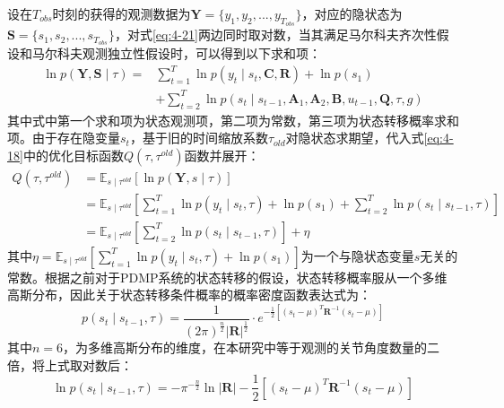 设在$T_{obs}$时刻的获得的观测数据为$\mathbf{Y}=\{y_1,y_2,...,y_{T_{obs}}\}$，对应的隐状态为$\mathbf S = \{s_1,s_2,...,s_{T_{obs}}\}$，对式\ref{eq:4-21}两边同时取对数，当其满足马尔科夫齐次性假设和马尔科夫观测独立性假设时，可以得到以下求和项：
\begin{equation}
    \begin{aligned}
    \ln p(\mathbf{Y}, \mathbf{S} \mid \tau)= & \sum_{t=1}^T \ln p\left(y_t \mid s_t, \mathbf{C}, \mathbf{R}\right)+\ln p\left(s_1\right) \\
    & +\sum_{t=2}^T \ln p\left(s_t \mid s_{t-1}, \mathbf{A}_1, \mathbf{A}_2, \mathbf{B}, u_{t-1}, \mathbf{Q}, \tau, g\right)
    \end{aligned}
    \label{eq:4-20}
\end{equation}
其中式中第一个求和项为状态观测项，第二项为常数，第三项为状态转移概率求和项。由于存在隐变量$s_t$，基于旧的时间缩放系数$\tau_{old}$对隐状态求期望，代入式\ref{eq:4-18}中的优化目标函数$ Q\left(\tau, \tau^{old}\right)$函数并展开：
\begin{equation}
\begin{aligned}
    Q\left(\tau, \tau^{old}\right)
    &=\mathbb{E}_{s \mid \tau^{old}}\left[\ln p(\mathbf{Y}, s \mid \tau)\right]\\
    & =\mathbb{E}_{s \mid \tau^{old}}\left[\sum_{t=1}^T \ln p\left(y_t \mid s_t, \tau\right)+\ln p\left(s_1\right)+\sum_{t=2}^T \ln p\left(s_t \mid s_{t-1}, \tau\right)\right] \\
    & =\mathbb{E}_{s \mid \tau^{old}}\left[\sum_{t=2}^T \ln p\left(s_t \mid s_{t-1}, \tau\right)\right] + \eta 
\end{aligned}
\label{eq:4-21}
\end{equation}
其中$\eta=\mathbb{E}_{s \mid \tau^{old}} \left[\sum_{t=1}^T \ln p\left(y_t \mid s_t, \tau\right) + \ln p\left(s_1\right)\right]$为一个与隐状态变量$s$无关的常数。根据之前对于PDMP系统的状态转移的假设，状态转移概率服从一个多维高斯分布，因此关于状态转移条件概率的概率密度函数表达式为：
\begin{equation}
    p\left(s_t \mid s_{t-1}, \tau\right)=\frac{1}{(2 \pi)^{\frac{n}{2}}|\mathbf{R}|^{\frac{1}{2}}} \cdot e^{-\frac{1}{2}\left[\left(s_t-\mu\right)^T \mathbf{R}^{-1}\left(s_t-\mu\right)\right]}
    \label{eq:4-22}
\end{equation}
其中$n=6$，为多维高斯分布的维度，在本研究中等于观测的关节角度数量的二倍，将上式取对数后：
\begin{equation}
    \ln p\left(s_t \mid s_{t-1}, \tau\right)=-\pi^{-\frac{n}{2}}\ln\mathbf{|R|}-\frac{1}{2}\left[\left(s_t-\mu\right)^T \mathbf{R}^{-1}\left(s_t-\mu\right)\right]
    \label{eq:4-23}
\end{equation}
